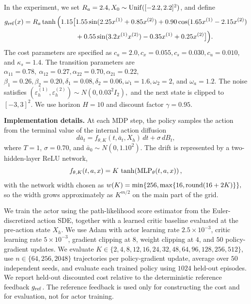\documentclass{article}
\newcommand{\1}{\mathbbm{1}}
\numberwithin{equation}{section}
\begin{document}
In the experiment, we set $R_a=2.4,X_0\sim{\rm Unif}([-2.2,2.2]^2)$, and define
\[
\begin{aligned}
g_{\rm ref}(x)
=
R_a\tanh\Big(1.15\big[
&1.55\sin(2.25x^{(1)}+0.85x^{(2)})
+0.90\cos(1.65x^{(1)}-2.15x^{(2)})\\
&+0.55\sin(3.2x^{(1)}x^{(2)})
-0.35x^{(1)}
+0.25x^{(2)}
\big]\Big).
\end{aligned}
\]
The cost parameters are specified as $c_a=2.0,  c_x=0.055,  c_s=0.030, c_u=0.010$, and $\kappa_s=1.4.$
The transition parameters are $\alpha_{11}=0.78,\ \alpha_{12}=0.27, 
\alpha_{22}=0.70,  \alpha_{21}=0.22,$
$\beta_1=0.26, \beta_2=0.20,
\delta_1=0.08, \delta_2=0.06,
\omega_1=1.6, \omega_2=2$, and $\omega_a=1.2.$
The noise satisfies $(\varepsilon_h^{(1)},\varepsilon_h^{(2)})\sim N(0,0.03^2I_2),$ and the next state is clipped to \([-3,3]^2\). We use horizon \(H=10\) and
discount factor \(\gamma=0.95\).



{\bf Implementation details.}
At each MDP step, the policy samples the action from the terminal value of the internal action diffusion
\[
    d\bar a_t
    =
    f_{\theta,K}(t,\bar a_t,X_h)\,dt+\sigma\,dB_t,
\]
where \(T=1\), \(\sigma=0.70\), and \(\bar a_0\sim N(0,1.10^2)\).  The drift is represented by a two-hidden-layer ReLU network,
\[
    f_{\theta,K}(t,a,x)
    =
    K\,
    \tanh\!\left(
        {\rm MLP}_{\theta}\!\left(t,a,x\right)
    \right),
\]
with the network width chosen as $ w(K)=\min\{256,\max\{16,{\rm round}(16+2K)\}\},$ so the width grows approximately as \(K^{m/2}\) on the main part of the grid.

We train the actor using the path-likelihood score estimator from the Euler-discretized action SDE, together with a learned critic baseline evaluated at the pre-action state \(X_h\). We use Adam with actor learning rate \(2.5\times10^{-3}\), critic learning rate \(5\times10^{-3}\), gradient clipping at \(8\), weight clipping at \(4\), and \(50\) policy-gradient updates. We evaluate
$
K\in\{2,4,8,12,16,24,32,48,64,96,128,256,512\}$,
use $n\in\{64,256,2048\}$ trajectories per policy-gradient update, average over \(50\) independent seeds, and evaluate each trained policy using \(1024\) held-out episodes. We report held-out discounted cost relative to the deterministic reference feedback \(g_{\rm ref}\). The reference feedback is used only for constructing the cost and for evaluation, not for actor training.
\end{document}
